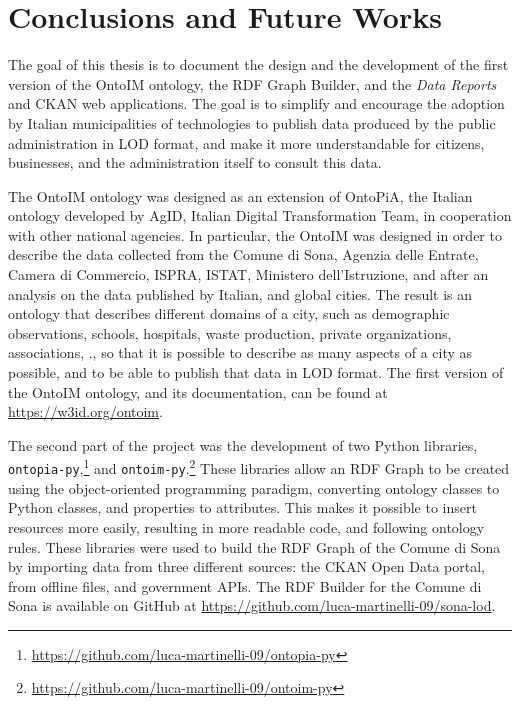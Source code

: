 \chapter{Conclusions and Future Works}
\label{chp:conclusions}

The goal of this thesis is to document the design and the development of the first version of the \ac{OntoIM} ontology, the \ac{RDF} Graph Builder, and the \textit{Data Reports} and CKAN web applications. The goal is to simplify and encourage the adoption by Italian municipalities of technologies to publish data produced by the public administration in \ac{LOD} format, and make it more understandable for citizens, businesses, and the administration itself to consult this data.

The \ac{OntoIM} ontology was designed as an extension of OntoPiA, the Italian ontology developed by \ac{AgID}, Italian Digital Transformation Team, in cooperation with other national agencies. In particular, the \ac{OntoIM} was designed in order to describe the data collected from the Comune di Sona, Agenzia delle Entrate, Camera di Commercio, ISPRA, ISTAT, Ministero dell'Istruzione, and after an analysis on the data published by Italian, and global cities. The result is an ontology that describes different domains of a city, such as demographic observations, schools, hospitals, waste production, private organizations, associations, \etc., so that it is possible to describe as many aspects of a city as possible, and to be able to publish that data in \acl{LOD} format. The first version of the \ac{OntoIM} ontology, and its documentation, can be found at \url{https://w3id.org/ontoim}.

The second part of the project was the development of two Python libraries, \verb#ontopia-py#,\footnote{\url{https://github.com/luca-martinelli-09/ontopia-py}} and \verb#ontoim-py#.\footnote{\url{https://github.com/luca-martinelli-09/ontoim-py}} These libraries allow an \ac{RDF} Graph to be created using the object-oriented programming paradigm, converting ontology classes to Python classes, and properties to attributes. This makes it possible to insert resources more easily, resulting in more readable code, and following ontology rules. These libraries were used to build the \ac{RDF} Graph of the Comune di Sona by importing data from three different sources: the CKAN Open Data portal, from offline files, and government \acsp{API}. The \ac{RDF} Builder for the Comune di Sona is available on GitHub at \url{https://github.com/luca-martinelli-09/sona-lod}.

